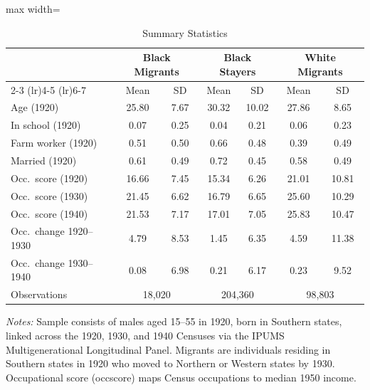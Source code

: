 \begin{table}[H]
\centering
\caption{Summary Statistics}
\label{tab:summary}
\begin{threeparttable}
\begin{adjustbox}{max width=\textwidth}
\begin{tabular}{lcccccc}
\toprule
 & \multicolumn{2}{c}{Black Migrants} & \multicolumn{2}{c}{Black Stayers} & \multicolumn{2}{c}{White Migrants} \\
\cmidrule(lr){2-3} \cmidrule(lr){4-5} \cmidrule(lr){6-7}
 & Mean & SD & Mean & SD & Mean & SD \\
\midrule
  Age (1920) & 25.80 & 7.67 & 30.32 & 10.02 & 27.86 & 8.65 \\
  In school (1920) & 0.07 & 0.25 & 0.04 & 0.21 & 0.06 & 0.23 \\
  Farm worker (1920) & 0.51 & 0.50 & 0.66 & 0.48 & 0.39 & 0.49 \\
  Married (1920) & 0.61 & 0.49 & 0.72 & 0.45 & 0.58 & 0.49 \\
  Occ.\ score (1920) & 16.66 & 7.45 & 15.34 & 6.26 & 21.01 & 10.81 \\
  Occ.\ score (1930) & 21.45 & 6.62 & 16.79 & 6.65 & 25.60 & 10.29 \\
  Occ.\ score (1940) & 21.53 & 7.17 & 17.01 & 7.05 & 25.83 & 10.47 \\
  Occ.\ change 1920--1930 & 4.79 & 8.53 & 1.45 & 6.35 & 4.59 & 11.38 \\
  Occ.\ change 1930--1940 & 0.08 & 6.98 & 0.21 & 6.17 & 0.23 & 9.52 \\
\midrule
  Observations & \multicolumn{2}{c}{18,020} & \multicolumn{2}{c}{204,360} & \multicolumn{2}{c}{98,803} \\
\bottomrule
\end{tabular}
\end{adjustbox}
\begin{tablenotes}[flushleft]
\small
\item \textit{Notes:} Sample consists of males aged 15--55 in 1920, born in Southern states, linked across the 1920, 1930, and 1940 Censuses via the IPUMS Multigenerational Longitudinal Panel. Migrants are individuals residing in Southern states in 1920 who moved to Northern or Western states by 1930. Occupational score (occscore) maps Census occupations to median 1950 income.
\end{tablenotes}
\end{threeparttable}
\end{table}

